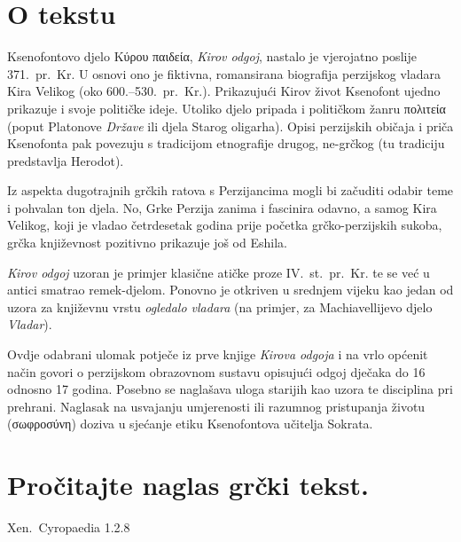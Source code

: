 


\section*{O tekstu}

Ksenofontovo djelo Κύρου παιδεία, \textit{Kirov odgoj}, nastalo je vjerojatno poslije 371.\ pr.~Kr. U osnovi ono je fiktivna, romansirana biografija perzijskog vladara Kira Velikog (oko 600.–530.\ pr.~Kr.). Prikazujući Kirov život Ksenofont ujedno prikazuje i svoje političke ideje. Utoliko djelo pripada i političkom žanru πολιτεία (poput Platonove \textit{Države} ili djela Starog oligarha). Opisi perzijskih običaja i priča Ksenofonta pak povezuju s tradicijom etnografije drugog, ne-grčkog (tu tradiciju predstavlja Herodot). 

Iz aspekta dugotrajnih grčkih ratova s Perzijancima mogli bi začuditi odabir teme i pohvalan ton djela. No, Grke Perzija zanima i fascinira odavno, a samog Kira Velikog, koji je vladao četrdesetak godina prije početka grčko-perzijskih sukoba, grčka književnost pozitivno prikazuje još od Eshila. 

\textit{Kirov odgoj} uzoran je primjer klasične atičke proze IV.~st.\ pr.~Kr. te se već u antici smatrao remek-djelom. Ponovno je otkriven u srednjem vijeku kao jedan od uzora za književnu vrstu \textit{ogledalo vladara} (na primjer, za Machiavellijevo djelo \textit{Vladar}). 

Ovdje odabrani ulomak potječe iz prve knjige \textit{Kirova odgoja} i na vrlo općenit način govori o perzijskom obrazovnom sustavu opisujući odgoj dječaka do 16 odnosno 17 godina. Posebno se naglašava uloga starijih kao uzora te disciplina pri prehrani. Naglasak na usvajanju umjerenosti ili razumnog pristupanja životu (σωφροσύνη) doziva u sjećanje etiku Ksenofontova učitelja Sokrata.

\newpage

\section*{Pročitajte naglas grčki tekst.}

Xen.\ Cyropaedia 1.2.8


